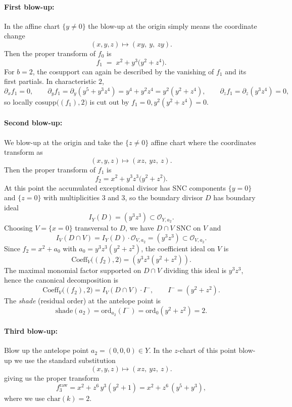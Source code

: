 \documentclass[11pt]{amsart}
\begin{document}
\paragraph{First blow-up:}
In the affine chart $\{y \neq 0\}$ the blow-up at the origin simply means the coordinate change
\[
(x,y,z)\longmapsto (xy,\ y,\ zy).
\]
Then the proper transform of $f_0$ is 
\[
f_1 \;=\; x^2 + y^3\bigl(y^2+z^4\bigr).
\]
For $b=2$, the cosupport can again be described by the vanishing of $f_1$ and its first partials.  In
characteristic $2$,
\[
\partial_x f_1=0,\qquad
\partial_y f_1=\partial_y(y^5+y^3z^4)=y^4+y^2z^4=y^2(y^2+z^4),\qquad
\partial_z f_1=\partial_z(y^3z^4)=0,
\]
so locally $\mathrm{cosupp}\bigl((f_1),2\bigr)$ is cut out by
$f_1=0, y^2(y^2+z^4)=0$.
\paragraph{Second blow-up:} We blow-up at the origin and take the $\{z\neq 0\}$ affine chart where the coordinates transform as
\[
(x,y,z)\longmapsto (xz,\ yz,\ z).
\]
Then the proper transform of $f_1$ is
\[
f_2 = x^2 + y^3z^3\bigl(y^2+z^2\bigr).
\]
At this point the accumulated exceptional divisor has SNC components $\{y=0\}$ and $\{z=0\}$ with
multiplicities $3$ and $3$, so the boundary divisor $D$ has boundary ideal
\[
I_Y(D)=(y^3z^3)\subset \mathcal{O}_{Y,a_2}.
\]
Choosing $V=\{x=0\}$ transversal to $D$, we have $D\cap V$ SNC on $V$ and
\[
I_V(D\cap V)=I_Y(D)\cdot \mathcal{O}_{V,a_2}=(y^3z^3)\subset \mathcal{O}_{V,a_2}.
\]
Since $f_2=x^2+a_0$ with $a_0=y^3z^3(y^2+z^2)$, the coefficient ideal on $V$ is
\[
\mathrm{Coeff}_V\bigl((f_2),2\bigr)=(y^3z^3(y^2+z^2)).
\]
The maximal monomial factor supported on $D\cap V$ dividing this ideal is $y^3z^3$, hence the canonical
decomposition is
\[
\mathrm{Coeff}_V\bigl((f_2),2\bigr)
= I_V(D\cap V)\cdot I^-,
\qquad I^-=(y^2+z^2).
\]
The \emph{shade} (residual order) at the antelope point is
\[
\mathrm{shade}(a_2)=\mathrm{ord}_{a_2}(I^-)=\mathrm{ord}_0(y^2+z^2)=2.
\]

\paragraph{Third blow-up:}
Blow up the antelope point $a_2=(0,0,0)\in Y$. In the $z$-chart of this point blow-up we use the standard
substitution
\[
(x,y,z)\longmapsto (xz,\ yz,\ z).
\]
giving us the proper transform 
\[
f_3^{\mathrm{raw}}
= x^2+z^6\,y^3(y^2+1)
= x^2+z^6\,(y^5+y^3),
\]
where we use $\mathrm{char}(k)=2$.
\end{document}
